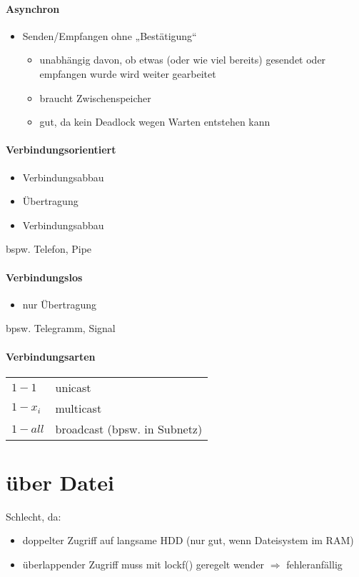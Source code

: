 \documentclass{scrreprt}
\renewcommand{\imptnt}[1]{#1}
\begin{document}
\paragraph{\imptnt{Asynchron}}
\begin{itemize}
\item Senden/Empfangen ohne „Bestätigung“
\begin{itemize}[label=$\to$]
\item unabhängig davon, ob etwas (oder wie viel bereits) gesendet oder empfangen wurde wird weiter gearbeitet
\item braucht Zwischenspeicher
\item gut, da kein Deadlock wegen Warten entstehen kann
\end{itemize}
\end{itemize}
\paragraph{\imptnt{Verbindungsorientiert}}
\begin{itemize}
\item Verbindungsabbau
\item Übertragung
\item Verbindungsabbau
\end{itemize}
bspw. Telefon, Pipe
\paragraph{\imptnt{Verbindungslos}}
\begin{itemize}
\item nur Übertragung
\end{itemize}
bpsw. Telegramm, Signal
\paragraph{Verbindungsarten}
\begin{tabular}{l l}
$1-1$ & unicast\\
$1-x_i$ & multicast\\
$1-all$ & broadcast (bpsw. in Subnetz)
\end{tabular}
\section{über Datei}
Schlecht, da:
\begin{itemize}
\item doppelter Zugriff auf langsame HDD (nur gut, wenn Dateisystem im RAM)
\item überlappender Zugriff muss mit lockf() geregelt wender $\Rightarrow$ fehleranfällig
\end{itemize}
\end{document}
